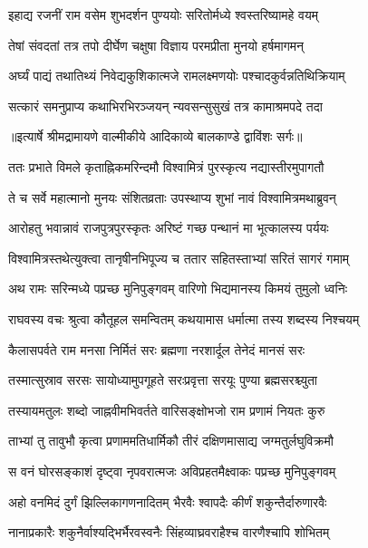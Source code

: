 \twolineshloka
{इहाद्य रजनीं राम वसेम शुभदर्शन}
{पुण्ययोः सरितोर्मध्ये श्वस्तरिष्यामहे वयम्} %

\twolineshloka
{तेषां संवदतां तत्र तपो दीर्घेण चक्षुषा}
{विज्ञाय परमप्रीता मुनयो हर्षमागमन्} %

\twolineshloka
{अर्घ्यं पाद्यं तथातिथ्यं निवेद्यकुशिकात्मजे}
{रामलक्ष्मणयोः पश्चादकुर्वन्नतिथिक्रियाम्} %

\twolineshloka
{सत्कारं समनुप्राप्य कथाभिरभिरञ्जयन्}
{न्यवसन्सुसुखं तत्र कामाश्रमपदे तदा} %


{॥इत्यार्षे श्रीमद्रामायणे वाल्मीकीये आदिकाव्ये बालकाण्डे द्वाविंशः सर्गः॥}


\twolineshloka
{ततः प्रभाते विमले कृताह्निकमरिन्दमौ}
{विश्वामित्रं पुरस्कृत्य नद्यास्तीरमुपागतौ} %

\twolineshloka
{ते च सर्वे महात्मानो मुनयः संशितव्रताः}
{उपस्थाप्य शुभां नावं विश्वामित्रमथाब्रुवन्} %

\twolineshloka
{आरोहतु भवान्नावं राजपुत्रपुरस्कृतः}
{अरिष्टं गच्छ पन्थानं मा भूत्कालस्य पर्ययः} %

\twolineshloka
{विश्वामित्रस्तथेत्युक्त्वा तानृषीनभिपूज्य च}
{ततार सहितस्ताभ्यां सरितं सागरं गमाम्} %

\twolineshloka
{अथ रामः सरिन्मध्ये पप्रच्छ मुनिपुङ्गवम्}
{वारिणो भिद्यमानस्य किमयं तुमुलो ध्वनिः} %

\twolineshloka
{राघवस्य वचः श्रुत्वा कौतूहल समन्वितम्}
{कथयामास धर्मात्मा तस्य शब्दस्य निश्चयम्} %

\twolineshloka
{कैलासपर्वते राम मनसा निर्मितं सरः}
{ब्रह्मणा नरशार्दूल तेनेदं मानसं सरः} %

\twolineshloka
{तस्मात्सुस्राव सरसः सायोध्यामुपगूहते}
{सरःप्रवृत्ता सरयूः पुण्या ब्रह्मसरश्च्युता} %

\twolineshloka
{तस्यायमतुलः शब्दो जाह्नवीमभिवर्तते}
{वारिसङ्क्षोभजो राम प्रणामं नियतः कुरु} %

\twolineshloka
{ताभ्यां तु तावुभौ कृत्वा प्रणाममतिधार्मिकौ}
{तीरं दक्षिणमासाद्य जग्मतुर्लघुविक्रमौ} %

\twolineshloka
{स वनं घोरसङ्काशं दृष्ट्वा नृपवरात्मजः}
{अविप्रहतमैक्ष्वाकः पप्रच्छ मुनिपुङ्गवम्} %

\twolineshloka
{अहो वनमिदं दुर्गं झिल्लिकागणनादितम्}
{भैरवैः श्वापदैः कीर्णं शकुन्तैर्दारुणारवैः} %

\twolineshloka
{नानाप्रकारैः शकुनैर्वाश्यद्भिर्भैरवस्वनैः}
{सिंहव्याघ्रवराहैश्च वारणैश्चापि शोभितम्} %

